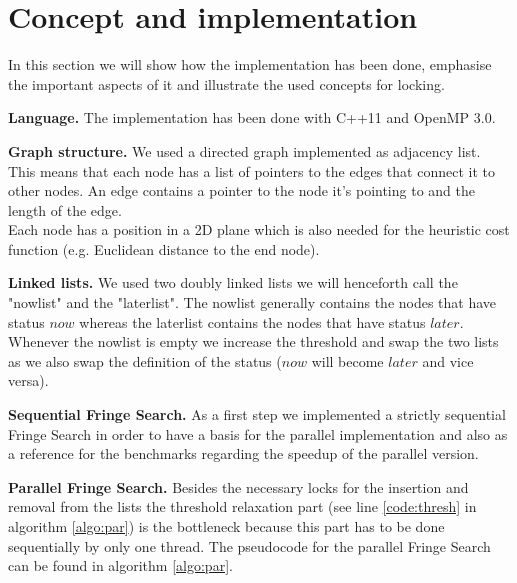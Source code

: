 \documentclass[letterpaper]{article}
\newcommand{\mypar}[1]{{\bf #1.}}
\begin{document}
\section{Concept and implementation}\label{sec:impl}

In this section we will show how the implementation has been done, emphasise the important aspects of it and illustrate the used concepts for locking.

\mypar{Language}
The implementation has been done with C++11 and OpenMP 3.0.

\mypar{Graph structure}
We used a directed graph implemented as adjacency list. This means that each node has a list of pointers to the edges that connect it to other nodes. An edge contains a pointer to the node it's pointing to and the length of the edge.\\
Each node has a position in a 2D plane which is also needed for the heuristic cost function (e.g. Euclidean distance to the end node).

\mypar{Linked lists}
We used two doubly linked lists we will henceforth call the "nowlist" and the "laterlist". The nowlist generally contains the nodes that have status $now$ whereas the laterlist contains the nodes that have status $later$. Whenever the nowlist is empty we increase the threshold and swap the two lists as we also swap the definition of the status ($now$ will become $later$ and vice versa).

\mypar{Sequential Fringe Search}
As a first step we implemented a strictly sequential Fringe Search in order to have a basis for the parallel implementation and also as a reference for the benchmarks regarding the speedup of the parallel version.

\mypar{Parallel Fringe Search}
Besides the necessary locks for the insertion and removal from the lists the threshold relaxation part (see line \ref{code:thresh} in algorithm \ref{algo:par}) is the bottleneck because this part has to be done sequentially by only one thread. The pseudocode for the parallel Fringe Search can be found in algorithm \ref{algo:par}.
\end{document}
